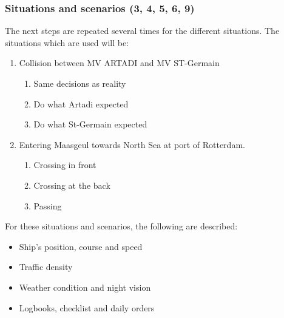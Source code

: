 
\subsubsection{Situations and scenarios (3, 4, 5, 6, 9)}
The next steps are repeated several times for the different situations. The situations which are used will be:
\begin{enumerate}
	\item Collision between MV ARTADI and MV ST-Germain
	\begin{enumerate}[label=(\Alph*)]
		\item Same decisions as reality
		\item Do what Artadi expected
		\item Do what St-Germain expected
	\end{enumerate}
	\item Entering Maasgeul towards North Sea at port of Rotterdam.
	\begin{enumerate}[label=(\Alph*)]
		\item Crossing in front
		\item Crossing at the back
		\item Passing
	\end{enumerate}
\end{enumerate}



For these situations and scenarios, the following are described:
\begin{itemize}
	\item Ship's position, course and speed
	\item Traffic density
	\item Weather condition and night vision
	\item Logbooks, checklist and daily orders
\end{itemize}


